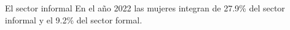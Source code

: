 El sector informal  En el año 2022 las mujeres integran de 27.9\% del sector informal y el 9.2\% del sector formal. 